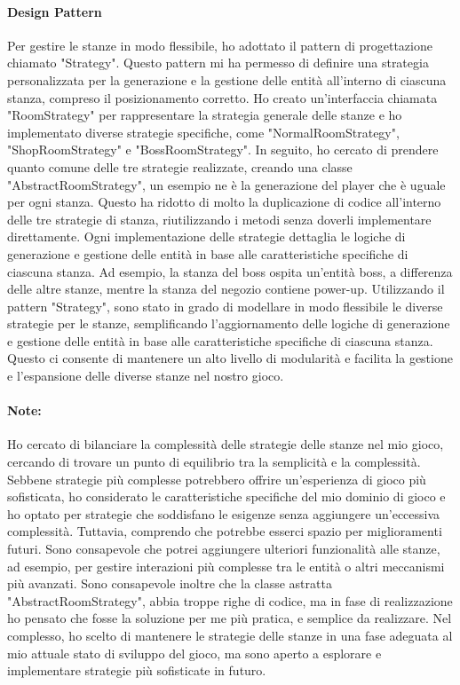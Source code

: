 \documentclass[a4paper,12pt]{report}
\begin{document}
\paragraph*{Design Pattern}
Per gestire le stanze in modo flessibile, ho adottato il pattern di progettazione chiamato "Strategy". 
Questo pattern mi ha permesso di definire una strategia personalizzata per la generazione e la gestione delle entità all'interno di ciascuna stanza, compreso il posizionamento corretto.
Ho creato un'interfaccia chiamata "RoomStrategy" per rappresentare la strategia generale delle stanze e ho implementato diverse strategie specifiche, come "NormalRoomStrategy", "ShopRoomStrategy" e "BossRoomStrategy".
In seguito, ho cercato di prendere quanto comune delle tre strategie realizzate, creando una classe "AbstractRoomStrategy", un esempio ne è la generazione del player che è uguale per ogni stanza.
Questo ha ridotto di molto la duplicazione di codice all'interno delle tre strategie di stanza, riutilizzando i metodi senza doverli implementare direttamente.
Ogni implementazione delle strategie dettaglia le logiche di generazione e gestione delle entità in base alle caratteristiche specifiche di ciascuna stanza. 
Ad esempio, la stanza del boss ospita un'entità boss, a differenza delle altre stanze, mentre la stanza del negozio contiene power-up.
Utilizzando il pattern "Strategy", sono stato in grado di modellare in modo flessibile le diverse strategie per le stanze, semplificando l'aggiornamento delle logiche di generazione e gestione delle entità in base alle caratteristiche specifiche di ciascuna stanza. 
Questo ci consente di mantenere un alto livello di modularità e facilita la gestione e l'espansione delle diverse stanze nel nostro gioco.
\paragraph*{Note:}
Ho cercato di bilanciare la complessità delle strategie delle stanze nel mio gioco, cercando di trovare un punto di equilibrio tra la semplicità e la complessità. 
Sebbene strategie più complesse potrebbero offrire un'esperienza di gioco più sofisticata, ho considerato le caratteristiche specifiche del mio dominio di gioco e ho optato per strategie che soddisfano le esigenze senza aggiungere un'eccessiva complessità.
Tuttavia, comprendo che potrebbe esserci spazio per miglioramenti futuri.
Sono consapevole che potrei aggiungere ulteriori funzionalità alle stanze, ad esempio, per gestire interazioni più complesse tra le entità o altri meccanismi più avanzati.
Sono consapevole inoltre che la classe astratta "AbstractRoomStrategy", abbia troppe righe di codice, ma in fase di realizzazione ho pensato che fosse la soluzione per me più pratica, e semplice da realizzare. 
Nel complesso, ho scelto di mantenere le strategie delle stanze in una fase adeguata al mio attuale stato di sviluppo del gioco, ma sono aperto a esplorare e implementare strategie più sofisticate in futuro.
\end{document}
